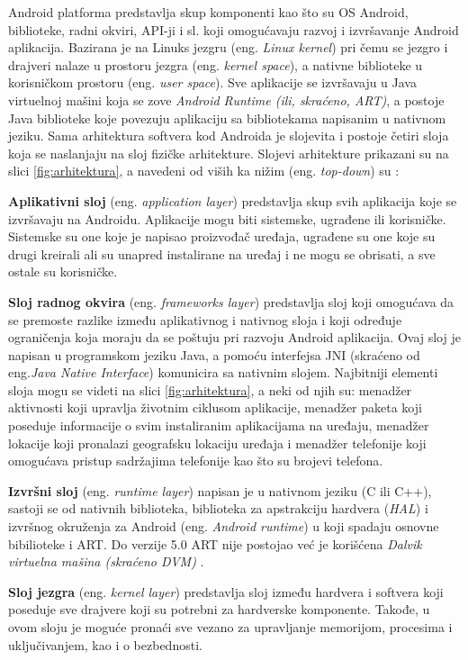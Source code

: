 \documentclass[android.tex]{subfiles}
\begin{document}
Android platforma predstavlja skup komponenti kao što su OS Android, biblioteke, radni okviri, API-ji i sl. koji omogućavaju razvoj i izvršavanje Android aplikacija. Bazirana je na Linuks jezgru (eng. \textit{Linux kernel}) pri čemu se jezgro i drajveri nalaze u prostoru jezgra (eng. \textit{kernel space}), a nativne biblioteke u korisničkom prostoru (eng. \textit{user space}). Sve aplikacije se izvršavaju u Java virtuelnoj mašini koja se zove \textit{Android Runtime (ili, skraćeno, ART)}, a postoje Java biblioteke koje povezuju aplikaciju sa bibliotekama napisanim u nativnom jeziku. Sama arhitektura softvera kod Androida je slojevita i postoje četiri sloja koja se naslanjaju na sloj fizičke arhitekture. Slojevi arhitekture prikazani su na slici \ref{fig:arhitektura}, a navedeni od viših ka nižim (eng. \textit{top-down}) su \cite{book:papp}:
\begin{description}
\item \textbf{Aplikativni sloj} (eng. \textit{application layer}) predstavlja skup svih aplikacija koje se izvršavaju na Androidu. Aplikacije mogu biti sistemske, ugrađene ili korisničke. Sistemske su one koje je napisao proizvođač uređaja, ugrađene su one koje su drugi kreirali ali su unapred instalirane na uređaj i ne mogu se obrisati, a sve ostale su korisničke.
\item \textbf{Sloj radnog okvira} (eng. \textit{frameworks layer}) predstavlja sloj koji omogućava da se premoste razlike između aplikativnog i nativnog sloja i koji određuje ograničenja koja moraju da se poštuju pri razvoju Android aplikacija. Ovaj sloj je napisan u programskom jeziku Java, a pomoću interfejsa JNI (skraćeno od eng.\textit{Java Native Interface}) komunicira sa nativnim slojem. Najbitniji elementi sloja mogu se videti na slici \ref{fig:arhitektura}, a neki od njih su: menadžer aktivnosti koji upravlja životnim ciklusom aplikacije, menadžer paketa koji poseduje informacije o svim instaliranim aplikacijama na uređaju, menadžer lokacije koji pronalazi geografsku lokaciju uređaja i menadžer telefonije koji omogućava pristup sadržajima telefonije kao što su brojevi telefona. 
\item \textbf{Izvršni sloj} (eng. \textit{runtime layer}) napisan je u nativnom jeziku (C ili C++), sastoji se od nativnih biblioteka, biblioteka za apstrakciju hardvera (\textit{HAL}) i izvršnog okruženja za Android (eng. \textit{Android runtime}) u koji spadaju osnovne bibilioteke i ART. Do verzije 5.0 ART nije postojao već je korišćena \textit{Dalvik virtuelna mašina (skraćeno DVM)} \cite{sajt:dalvik}. 
\item \textbf{Sloj jezgra} (eng. \textit{kernel layer}) predstavlja sloj između hardvera i softvera koji poseduje sve drajvere koji su potrebni za hardverske komponente. Takođe, u ovom sloju je moguće pronaći sve vezano za upravljanje memorijom, procesima i uključivanjem, kao i o bezbednosti. 
\end{description}
\end{document}
